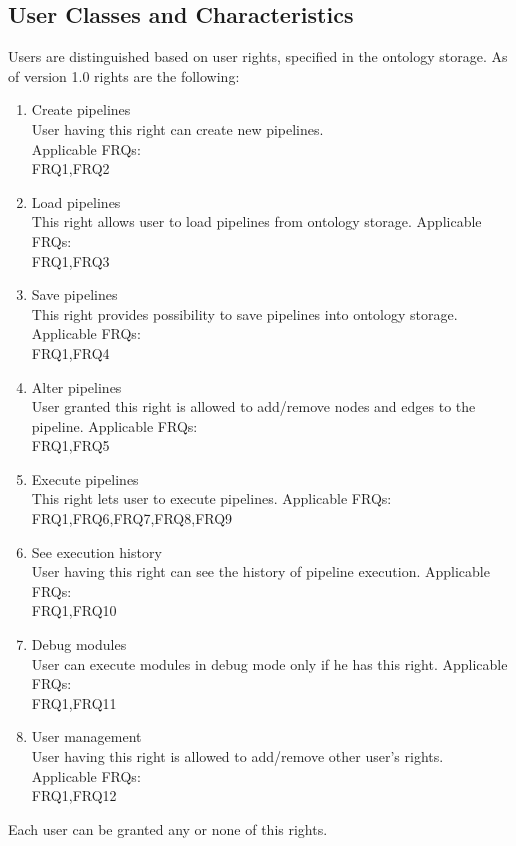 \documentclass{article}
\begin{document}
\subsection{User Classes and Characteristics}
Users are distinguished based on user rights, specified in the ontology storage. As of version 1.0 rights are the following:
\begin{enumerate}
    \item Create pipelines\\
	User having this right can create new pipelines.\\
	Applicable FRQs:\\
	FRQ1,FRQ2
    \item Load pipelines\\
	This right allows user to load pipelines from ontology storage.
	Applicable FRQs:\\
	FRQ1,FRQ3
    \item Save pipelines\\
	This right provides possibility to save pipelines into ontology storage.
	Applicable FRQs:\\
	FRQ1,FRQ4
    \item Alter pipelines\\
	User granted this right is allowed to add/remove nodes and edges to the pipeline.
	Applicable FRQs:\\
	FRQ1,FRQ5
    \item Execute pipelines\\
	This right lets user to execute pipelines.
	Applicable FRQs:\\
	FRQ1,FRQ6,FRQ7,FRQ8,FRQ9
    \item See execution history\\
	User having this right can see the history of pipeline execution.
	Applicable FRQs:\\
	FRQ1,FRQ10
    \item Debug modules\\
	User can execute modules in debug mode only if he has this right.
	Applicable FRQs:\\
	FRQ1,FRQ11
    \item User management\\
	User having this right is allowed to add/remove other user's rights.
	Applicable FRQs:\\
	FRQ1,FRQ12
\end{enumerate}
Each user can be granted any or none of this rights.
\end{document}
